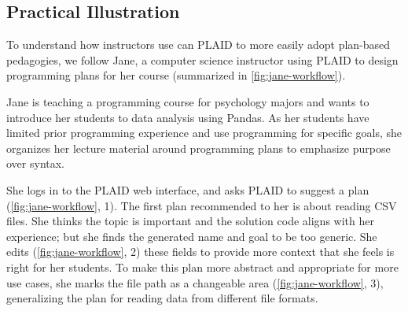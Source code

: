 \subsection{Practical Illustration}

To understand how instructors use can PLAID to more easily adopt plan-based pedagogies, we follow Jane, a computer science instructor using PLAID to design programming plans for her course (summarized in \cref{fig:jane-workflow}).

Jane is teaching a programming course for psychology majors and wants to introduce her students to data analysis using Pandas. As her students have limited prior programming experience and use programming for specific goals, she organizes her lecture material around programming plans to emphasize purpose over syntax. 

She logs in to the PLAID web interface, %
and asks PLAID to suggest a plan (\cref{fig:jane-workflow}, 1). The first plan recommended to her 
is about reading CSV files. 
She thinks the topic is important and the solution code aligns with her experience; %
but she finds the generated name and goal to be too generic. She edits (\cref{fig:jane-workflow}, 2) these fields to provide more context that she feels is right for her students.
To make this plan more abstract and appropriate for more use cases, %
she marks the file path as a changeable area (\cref{fig:jane-workflow}, 3), generalizing the plan for reading data from different file formats.

